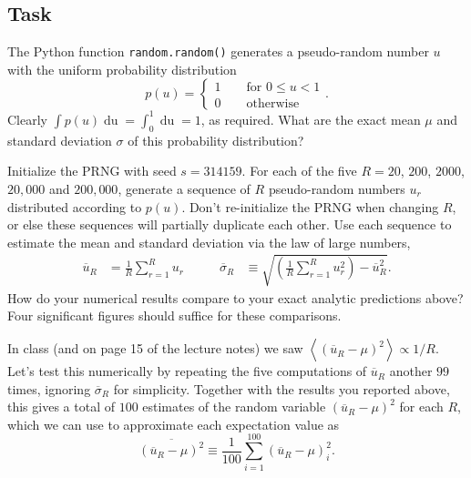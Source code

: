 \documentclass[12 pt]{article} %
\newcommand{\ubar}{\ensuremath{\overline u} }
\newcommand{\si}{\ensuremath{\sigma} }
\newcommand{\sibar}{\ensuremath{\overline\sigma} }
\renewcommand{\d}[1]{\ensuremath{\mathop{d#1}} }
\newcommand{\vev}[1]{\ensuremath{\left\langle #1 \right\rangle} }
\newcommand{\showmarks}[1]{\rightline{\texttt{[#1 marks]}}} %
\begin{document}
\newpage %
\subsection*{Task}
The Python function \texttt{random.random()} generates a pseudo-random number $u$ with the uniform probability distribution
\begin{equation}
  \label{eq:uniform}
  p(u) = \left\{\begin{array}{l}1 \qquad \mbox{for } 0 \leq u < 1 \\
                                0 \qquad \mbox{otherwise}\end{array}\right. .
\end{equation}
Clearly $\int p(u) \d{u }= \int_0^1 \d{u} = 1$, as required.
What are the exact mean $\mu$ and standard deviation \si of this probability distribution?

\showmarks{2}

Initialize the PRNG with seed $s = 314159$.
For each of the five $R = 20$, $200$, $2000$, $20{,}000$ and $200{,}000$, generate a sequence of $R$ pseudo-random numbers $u_r$ distributed according to $p(u)$.
Don't re-initialize the PRNG when changing $R$, or else these sequences will partially duplicate each other.
Use each sequence to estimate the mean and standard deviation via the law of large numbers,
\begin{align}
  \label{eq:mean}
  \ubar_R & = \frac{1}{R} \sum_{r = 1}^R u_r \qquad &
  \sibar_R & \equiv \sqrt{\left(\frac{1}{R} \sum_{r = 1}^R u_r^2\right) - \ubar_R^2}.
\end{align}
How do your numerical results compare to your exact analytic predictions above?
Four significant figures should suffice for these comparisons.

\showmarks{5}

In class (and on page 15 of the lecture notes) we saw $\displaystyle \vev{\left(\ubar_R - \mu\right)^2} \propto 1 / R$.
Let's test this numerically by repeating the five computations of $\ubar_R$ another $99$ times, ignoring $\sibar_R$ for simplicity.
Together with the results you reported above, this gives a total of $100$ estimates of the random variable $\left(\ubar_R - \mu\right)^2$ for each $R$, which we can use to approximate each expectation value as
\begin{equation}
  \overline{\left(\ubar_R - \mu\right)^2} \equiv \frac{1}{100} \sum_{i = 1}^{100} \left(\ubar_R - \mu\right)_i^2.
\end{equation}
\end{document}
